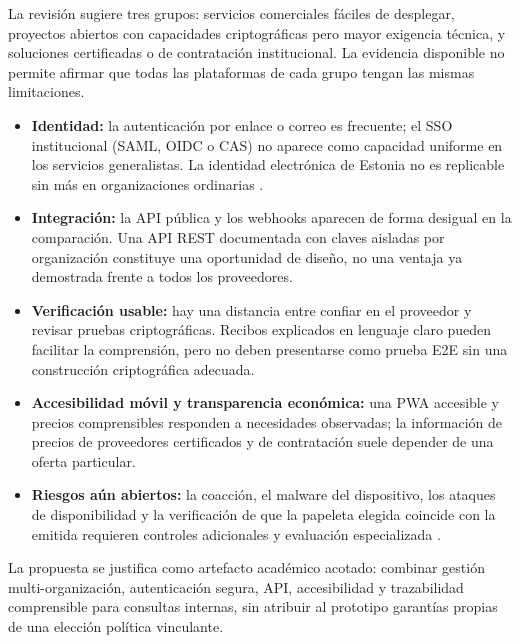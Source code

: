 La revisión sugiere tres grupos: servicios comerciales fáciles de desplegar,
proyectos abiertos con capacidades criptográficas pero mayor exigencia técnica,
y soluciones certificadas o de contratación institucional. La evidencia
disponible no permite afirmar que todas las plataformas de cada grupo tengan
las mismas limitaciones.
\begin{itemize}
  \item \textbf{Identidad:} la autenticación por enlace o correo es frecuente;
  el SSO institucional (SAML, OIDC o CAS) no aparece como capacidad uniforme
  en los servicios generalistas. La identidad electrónica de Estonia no es
  replicable sin más en organizaciones ordinarias \citep{springall2014estonia,belenios2026}.
  \item \textbf{Integración:} la API pública y los webhooks aparecen de forma
  desigual en la comparación. Una API REST documentada con claves aisladas por
  organización constituye una oportunidad de diseño, no una ventaja ya
  demostrada frente a todos los proveedores.
  \item \textbf{Verificación usable:} hay una distancia entre confiar en el
  proveedor y revisar pruebas criptográficas. Recibos explicados en lenguaje
  claro pueden facilitar la comprensión, pero no deben presentarse como prueba
  E2E sin una construcción criptográfica adecuada.
  \item \textbf{Accesibilidad móvil y transparencia económica:} una PWA
  accesible y precios comprensibles responden a necesidades observadas; la
  información de precios de proveedores certificados y de contratación suele
  depender de una oferta particular.
  \item \textbf{Riesgos aún abiertos:} la coacción, el malware del dispositivo,
  los ataques de disponibilidad y la verificación de que la papeleta elegida
  coincide con la emitida requieren controles adicionales y evaluación
  especializada \citep{coe2017evoting,specter2020voatz}.
\end{itemize}

La propuesta se justifica como artefacto académico acotado: combinar gestión
multi-organización, autenticación segura, API, accesibilidad y
trazabilidad comprensible para consultas internas, sin atribuir al prototipo
garantías propias de una elección política vinculante.
